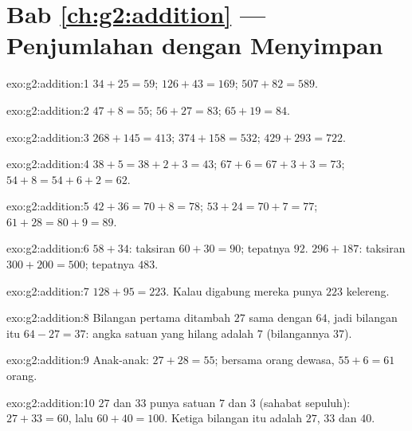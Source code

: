 \section*{Bab \ref{ch:g2:addition} --- Penjumlahan dengan Menyimpan}

\begin{solution}{exo:g2:addition:1}
$34 + 25 = 59$; \quad $126 + 43 = 169$; \quad $507 + 82 = 589$.
\end{solution}

\begin{solution}{exo:g2:addition:2}
$47 + 8 = 55$; \quad $56 + 27 = 83$; \quad $65 + 19 = 84$.
\end{solution}

\begin{solution}{exo:g2:addition:3}
$268 + 145 = 413$; \quad $374 + 158 = 532$; \quad
$429 + 293 = 722$.
\end{solution}

\begin{solution}{exo:g2:addition:4}
$38 + 5 = 38 + 2 + 3 = 43$; \quad $67 + 6 = 67 + 3 + 3 = 73$; \quad
$54 + 8 = 54 + 6 + 2 = 62$.
\end{solution}

\begin{solution}{exo:g2:addition:5}
$42 + 36 = 70 + 8 = 78$; \quad $53 + 24 = 70 + 7 = 77$; \quad
$61 + 28 = 80 + 9 = 89$.
\end{solution}

\begin{solution}{exo:g2:addition:6}
$58 + 34$: taksiran $60 + 30 = 90$; tepatnya $92$.
$296 + 187$: taksiran $300 + 200 = 500$; tepatnya $483$.
\end{solution}

\begin{solution}{exo:g2:addition:7}
$128 + 95 = 223$. Kalau digabung mereka punya $223$ kelereng.
\end{solution}

\begin{solution}{exo:g2:addition:8}
Bilangan pertama ditambah $27$ sama dengan $64$, jadi bilangan itu
$64 - 27 = 37$: angka satuan yang hilang adalah $7$ (bilangannya $37$).
\end{solution}

\begin{solution}{exo:g2:addition:9}
Anak-anak: $27 + 28 = 55$; bersama orang dewasa, $55 + 6 = 61$
orang.
\end{solution}

\begin{solution}{exo:g2:addition:10}
$27$ dan $33$ punya satuan $7$ dan $3$ (sahabat sepuluh):
$27 + 33 = 60$, lalu $60 + 40 = 100$. Ketiga bilangan itu adalah
$27$, $33$ dan $40$.

\end{solution}
